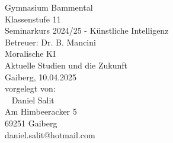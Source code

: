 \documentclass[12pt]{extarticle}
\begin{document}
    \begin{titlepage}
        \begin{center}
            \vspace{3 cm}
            \large
            Gymnasium Bammental \\
            Klassenstufe 11 \\
            Seminarkurs 2024/25 - Künstliche Intelligenz \\
            Betreuer: Dr. B. Mancini \\
            \vfill
            \Huge Moralische KI \\
            \huge Aktuelle Studien und die Zukunft \\
            \vspace{5 cm}
            \large
            Gaiberg, 10.04.2025 \\
            \vspace{2 cm}
            vorgelegt von: \\
            ~\newline
            Daniel Salit \\
            Am Himbeeracker 5 \\
            69251 Gaiberg \\
            daniel.salit@hotmail.com \\
        \end{center}
        \normalsize
    \end{titlepage}


    \tableofcontents

    \clearpage

    

    \clearpage
    
    
    

    

    

    

    \clearpage
    
\end{document}
